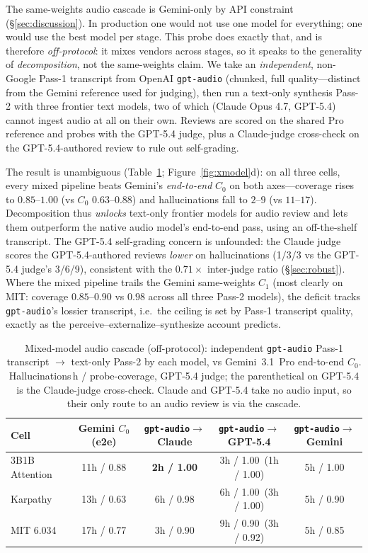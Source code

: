 \documentclass[11pt]{article}
\begin{document}
The same-weights audio cascade is Gemini-only by API constraint (\S\ref{sec:discussion}). In production one would not use one model for everything; one would use the best model per stage. This probe does exactly that, and is therefore \emph{off-protocol}: it mixes vendors across stages, so it speaks to the generality of \emph{decomposition}, not the same-weights claim. We take an \emph{independent}, non-Google Pass-1 transcript from OpenAI \texttt{gpt-audio} (chunked, full quality---distinct from the Gemini reference used for judging), then run a text-only synthesis Pass-2 with three frontier text models, two of which (Claude Opus 4.7, GPT-5.4) cannot ingest audio at all on their own. Reviews are scored on the shared Pro reference and probes with the GPT-5.4 judge, plus a Claude-judge cross-check on the GPT-5.4-authored review to rule out self-grading.

The result is unambiguous (Table~\ref{tab:mixed}; Figure~\ref{fig:xmodel}d): on all three cells, every mixed pipeline beats Gemini's \emph{end-to-end} $C_0$ on both axes---coverage rises to $0.85$--$1.00$ (vs $C_0$ $0.63$--$0.88$) and hallucinations fall to $2$--$9$ (vs $11$--$17$). Decomposition thus \emph{unlocks} text-only frontier models for audio review and lets them outperform the native audio model's end-to-end pass, using an off-the-shelf transcript. The GPT-5.4 self-grading concern is unfounded: the Claude judge scores the GPT-5.4-authored reviews \emph{lower} on hallucinations (1/3/3 vs the GPT-5.4 judge's 3/6/9), consistent with the $0.71\times$ inter-judge ratio (\S\ref{sec:robust}). Where the mixed pipeline trails the Gemini same-weights $C_1$ (most clearly on MIT: coverage $0.85$--$0.90$ vs $0.98$ across all three Pass-2 models), the deficit tracks \texttt{gpt-audio}'s lossier transcript, i.e.\ the ceiling is set by Pass-1 transcript quality, exactly as the perceive--externalize--synthesize account predicts.

\begin{table}[h]
\centering
\small
\caption{Mixed-model audio cascade (off-protocol): independent \texttt{gpt-audio} Pass-1 transcript $\to$ text-only Pass-2 by each model, vs Gemini~3.1~Pro end-to-end $C_0$. Hallucinations\,h / probe-coverage, GPT-5.4 judge; the parenthetical on GPT-5.4 is the Claude-judge cross-check. Claude and GPT-5.4 take no audio input, so their only route to an audio review is via the cascade.}
\label{tab:mixed}
\setlength{\tabcolsep}{3pt}
\begin{tabular}{lcccc}
\toprule
Cell & Gemini $C_0$ (e2e) & \texttt{gpt-audio}$\to$Claude & \texttt{gpt-audio}$\to$GPT-5.4 & \texttt{gpt-audio}$\to$Gemini \\
\midrule
3B1B Attention & 11h / 0.88 & \textbf{2h / 1.00} & 3h / 1.00 \,(1h / 1.00) & 5h / 1.00 \\
Karpathy       & 13h / 0.63 & 6h / 0.98 & 6h / 1.00 \,(3h / 1.00) & 5h / 0.90 \\
MIT 6.034      & 17h / 0.77 & 3h / 0.90 & 9h / 0.90 \,(3h / 0.92) & 5h / 0.85 \\
\bottomrule
\end{tabular}
\end{table}
\end{document}
